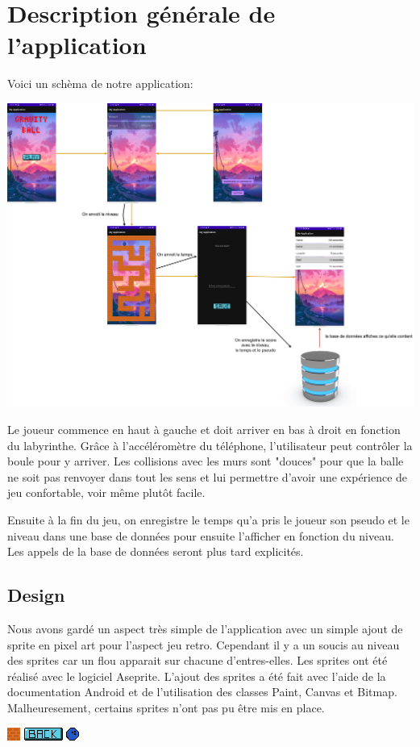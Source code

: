 \documentclass{article}
\begin{document}
\section{Description générale de l'application}
Voici un schèma de notre application: 
\begin{center}
  \includegraphics[scale=0.125]{schema.png} %
\end{center}
\label{section:description}
Le joueur commence en haut à gauche et doit arriver en bas à droit en fonction du labyrinthe. Grâce à l'accéléromètre du téléphone, l'utilisateur peut contrôler la boule pour y arriver. Les collisions avec les murs sont "douces" pour que la balle ne soit pas renvoyer dans tout les sens et lui permettre d'avoir une expérience de jeu confortable, voir même plutôt facile.

Ensuite à la fin du jeu, on enregistre le temps qu'a pris le joueur son pseudo et le niveau dans une base de données pour ensuite l'afficher en fonction du niveau. Les appels de la base de données seront plus tard explicités.

\subsection{Design}
Nous avons gardé un aspect très simple de l'application avec un simple ajout de sprite en pixel art pour l'aspect jeu retro. Cependant il y a un soucis au niveau des sprites car un flou apparait sur chacune d'entres-elles. Les sprites ont été réalisé avec le logiciel Aseprite. L'ajout des sprites a été fait avec l'aide de la documentation Android et de l'utilisation des classes Paint, Canvas et Bitmap. Malheuresement, certains sprites n'ont pas pu être mis en place.
\begin{center}
  \includegraphics[scale=2]{mur.png}
  \includegraphics[scale=2]{back.png}
  \includegraphics[scale=2]{ball.png}
\end{center}
\end{document}
